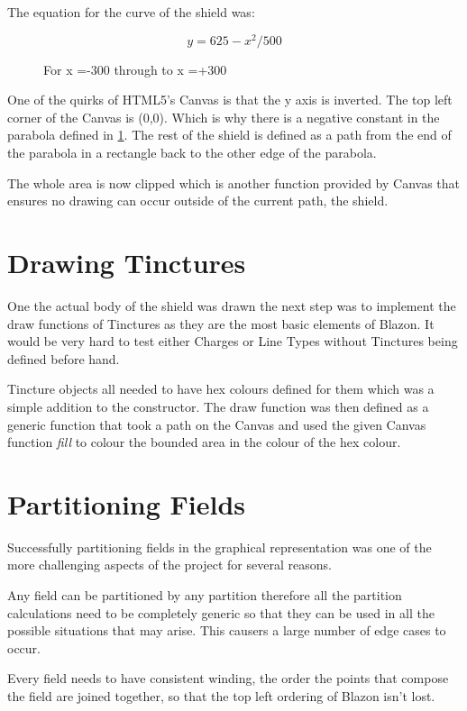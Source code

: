 The equation for the curve of the shield was:


\begin{figure}[H]
$$ y = 625- x^2/500  $$
\caption{For x =-300 through to x =+300}
\label{math:curve}
\end{figure}


One of the quirks of HTML5's Canvas is that the y axis is inverted.  The top left corner of the Canvas is (0,0).  Which is why there is a negative constant in the parabola defined in \ref{math:curve}.  The rest of the shield is defined as a path from the end of the parabola in a rectangle back to the other edge of the parabola.

The whole area is now clipped which is another function provided by Canvas that ensures no drawing can occur outside of the current path, the shield. 


\section{Drawing Tinctures}
{
	
One the actual body of the shield was drawn the next step was to implement the draw functions of Tinctures as they are the most basic elements of Blazon.  It would be very hard to test either Charges or Line Types without Tinctures being defined before hand.

Tincture objects all needed to have hex colours defined for them which was a simple addition to the constructor.  The draw function was then defined as a generic function that took a path on the Canvas and used the given Canvas function \emph{fill} to colour the bounded area in the colour of the hex colour.  

}

\section{Partitioning Fields}

Successfully partitioning fields in the graphical representation was one of the more challenging aspects of the project for several reasons.


Any field can be partitioned by any partition therefore all the partition calculations need to be completely generic so that they can be used in all the possible situations that may arise.  This causers a large number of edge cases to occur. 

Every field needs to have consistent winding, the order the points that compose the field are joined together, so that the top left ordering of Blazon isn't lost.


